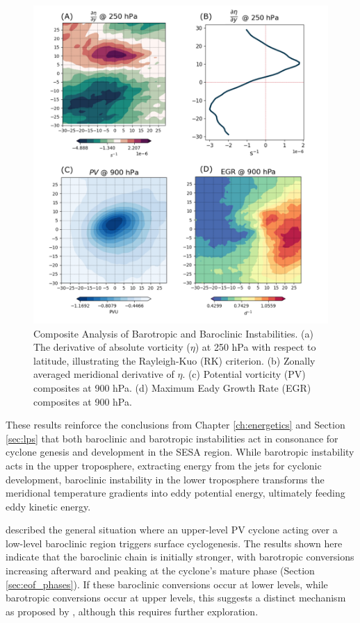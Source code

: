 \begin{figure}[!htbp]
    \centering
    \includegraphics[width=\textwidth]{figs_6/ibc_ibt_panel.pdf}
    \caption[Rayleigh Criterion and EGR]{Composite Analysis of Barotropic and Baroclinic Instabilities. (a) The derivative of absolute vorticity ($\eta$) at 250 hPa with respect to latitude, illustrating the Rayleigh-Kuo (RK) criterion. (b) Zonally averaged meridional derivative of $\eta$. (c) Potential vorticity (PV) composites at 900 hPa. (d) Maximum Eady Growth Rate (EGR) composites at 900 hPa.}
    \label{fig:ibc_ibt_panel}
\end{figure}

These results reinforce the conclusions from Chapter \ref{ch:energetics} and Section \ref{sec:lps} that both baroclinic and barotropic instabilities act in consonance for cyclone genesis and development in the SESA region. While barotropic instability acts in the upper troposphere, extracting energy from the jets for cyclonic development, baroclinic instability in the lower troposphere transforms the meridional temperature gradients into eddy potential energy, ultimately feeding eddy kinetic energy.

\citet{hoskins1985use} described the general situation where an upper-level PV cyclone acting over a low-level baroclinic region triggers surface cyclogenesis. The results shown here indicate that the baroclinic chain is initially stronger, with barotropic conversions increasing afterward and peaking at the cyclone's mature phase (Section \ref{sec:eof_phases}). If these baroclinic conversions occur at lower levels, while barotropic conversions occur at upper levels, this suggests a distinct mechanism as proposed by \citet{hoskins1985use}, although this requires further exploration.

